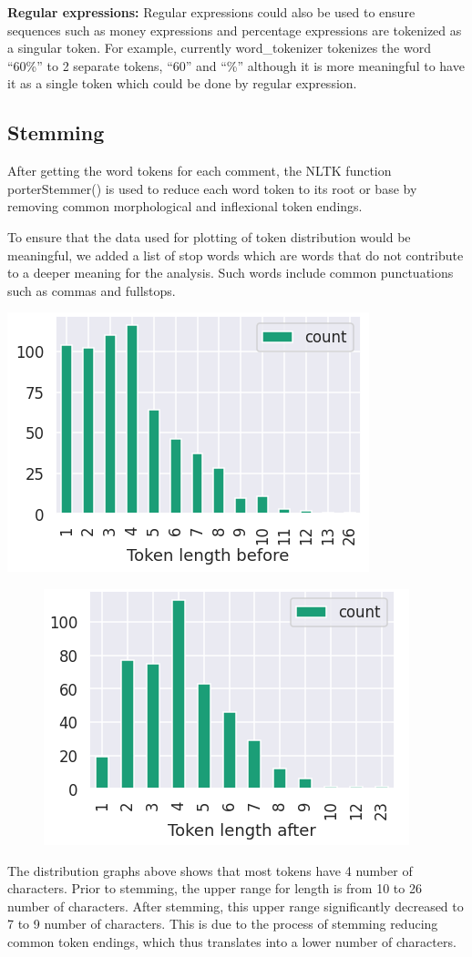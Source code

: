 \documentclass[sigconf,nonacm=true]{acmart}
\begin{document}
 {\bf Regular expressions:}
Regular expressions could also be used to ensure sequences such as money expressions and percentage expressions are tokenized as a singular token. For example, currently word\_tokenizer tokenizes the word “60\%” to 2 separate tokens, “60” and “\%” although it is more meaningful to have it as a single token which could be done by regular expression. 



\subsection{Stemming}
After getting the word tokens for each comment, the NLTK function porterStemmer() is used to reduce each word token to its root or base by removing common morphological and inflexional token endings.

To ensure that the data used for plotting of token distribution would be meaningful, we added a list of stop words which are words that do not contribute to a deeper meaning for the analysis. Such words include common punctuations such as commas and fullstops. \linebreak

\includegraphics[scale=0.55]{ss1.png}

    \begin{figure}[H]
        \centering
        \includegraphics[scale=0.55]{ss2.png}
    \end{figure}
The distribution graphs above shows that most tokens have 4 number of characters. Prior to stemming, the upper range for length is from 10 to 26 number of characters. After stemming, this upper range significantly decreased to 7 to 9 number of characters. This is due to the process of stemming reducing common token endings, which thus translates into a lower number of characters. 
\end{document}
